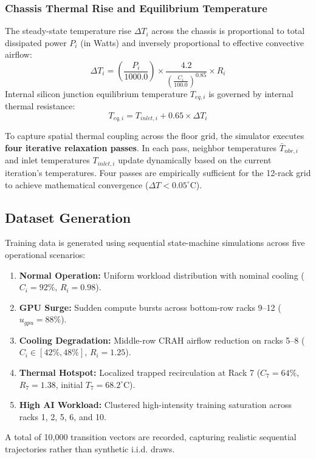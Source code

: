 \documentclass[conference,10pt]{IEEEtran}
\begin{document}
\subsubsection{Chassis Thermal Rise and Equilibrium Temperature}
The steady-state temperature rise $\Delta T_i$ across the chassis is proportional to total dissipated power $P_i$ (in Watts) and inversely proportional to effective convective airflow:
\begin{equation}
\label{eq:deltat}
\Delta T_i = \left(\frac{P_i}{1000.0}\right) \times \frac{4.2}{\left(\frac{C_i}{100.0}\right)^{0.85}} \times R_i
\end{equation}
Internal silicon junction equilibrium temperature $T_{eq,i}$ is governed by internal thermal resistance:
\begin{equation}
\label{eq:teq}
T_{eq,i} = T_{inlet,i} + 0.65 \times \Delta T_i
\end{equation}

To capture spatial thermal coupling across the floor grid, the simulator executes \textbf{four iterative relaxation passes}. In each pass, neighbor temperatures $\bar{T}_{nbr,i}$ and inlet temperatures $T_{inlet,i}$ update dynamically based on the current iteration's temperatures. Four passes are empirically sufficient for the 12-rack grid to achieve mathematical convergence ($\Delta T < 0.05^\circ\text{C}$).

\subsection{Dataset Generation}
Training data is generated using sequential state-machine simulations across five operational scenarios:
\begin{enumerate}
    \item \textbf{Normal Operation:} Uniform workload distribution with nominal cooling ($C_i = 92\%$, $R_i = 0.98$).
    \item \textbf{GPU Surge:} Sudden compute bursts across bottom-row racks 9--12 ($u_{gpu} = 88\%$).
    \item \textbf{Cooling Degradation:} Middle-row CRAH airflow reduction on racks 5--8 ($C_i \in [42\%, 48\%]$, $R_i = 1.25$).
    \item \textbf{Thermal Hotspot:} Localized trapped recirculation at Rack 7 ($C_7 = 64\%$, $R_7 = 1.38$, initial $T_7 = 68.2^\circ\text{C}$).
    \item \textbf{High AI Workload:} Clustered high-intensity training saturation across racks 1, 2, 5, 6, and 10.
\end{enumerate}
A total of 10,000 transition vectors are recorded, capturing realistic sequential trajectories rather than synthetic i.i.d. draws.
\end{document}
